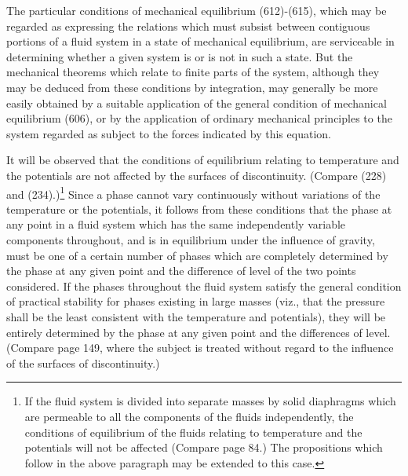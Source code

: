 \documentclass[12pt]{article}
\begin{document}
The particular conditions of mechanical equilibrium (612)-(615), which may be regarded as expressing the relations which must subsist between contiguous portions of a fluid system in a state of mechanical equilibrium, are serviceable in determining whether a given system is or is not in such a state. But the mechanical theorems which relate to finite parts of the system, although they may be deduced from these conditions by integration, may generally be more easily obtained by a suitable application of the general condition of mechanical equilibrium (606), or by the application of ordinary mechanical principles to the system regarded as subject to the forces indicated by this equation.

It will be observed that the conditions of equilibrium relating to temperature and the potentials are not affected by the surfaces of discontinuity. (Compare (228) and (234).)\footnote{If the fluid system is divided into separate masses by solid diaphragms which are permeable to all the components of the fluids independently, the conditions of equilibrium of the fluids relating to temperature and the potentials will not be affected (Compare page 84.) The propositions which follow in the above paragraph may be extended to this case.} Since a phase cannot vary continuously without variations of the temperature or the potentials, it follows from these conditions that the phase at any point in a fluid system which has the same independently variable components throughout, and is in equilibrium under the influence of gravity, must be one of a certain number of phases which are completely determined by the phase at any given point and the difference of level of the two points considered. If the phases throughout the fluid system satisfy the general condition of practical stability for phases existing in large masses (viz., that the pressure shall be the least consistent with the temperature and potentials), they will be entirely determined by the phase at any given point and the differences of level. (Compare page 149, where the subject is treated without regard to the influence of the surfaces of discontinuity.)
\end{document}
